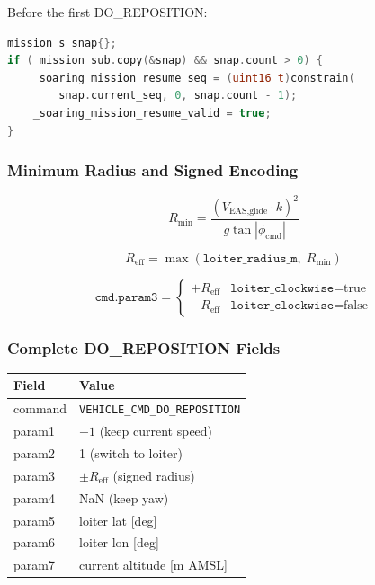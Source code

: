 \documentclass[12pt,a4paper]{article}
\begin{document}
Before the first DO\_REPOSITION:
\begin{lstlisting}[language=C++]
mission_s snap{};
if (_mission_sub.copy(&snap) && snap.count > 0) {
    _soaring_mission_resume_seq = (uint16_t)constrain(
        snap.current_seq, 0, snap.count - 1);
    _soaring_mission_resume_valid = true;
}
\end{lstlisting}

\subsubsection{Minimum Radius and Signed Encoding}

\begin{equation}
  R_{\min} = \frac{(V_{\text{EAS,glide}} \cdot k)^2}{g \tan|\phi_{\text{cmd}}|}
\end{equation}

\begin{equation}
  R_{\text{eff}} = \max(\texttt{loiter\_radius\_m},\; R_{\min})
\end{equation}

\begin{equation}
  \texttt{cmd.param3} = \begin{cases}
    +R_{\text{eff}} & \texttt{loiter\_clockwise} = \text{true} \\
    -R_{\text{eff}} & \texttt{loiter\_clockwise} = \text{false}
  \end{cases}
\end{equation}

\subsubsection{Complete DO\_REPOSITION Fields}

\begin{center}
\begin{tabular}{ll}
\toprule
Field & Value \\
\midrule
command & \texttt{VEHICLE\_CMD\_DO\_REPOSITION} \\
param1 & $-1$ (keep current speed) \\
param2 & 1 (switch to loiter) \\
param3 & $\pm R_{\text{eff}}$ (signed radius) \\
param4 & NaN (keep yaw) \\
param5 & loiter lat [deg] \\
param6 & loiter lon [deg] \\
param7 & current altitude [m AMSL] \\
\bottomrule
\end{tabular}
\end{center}
\end{document}
